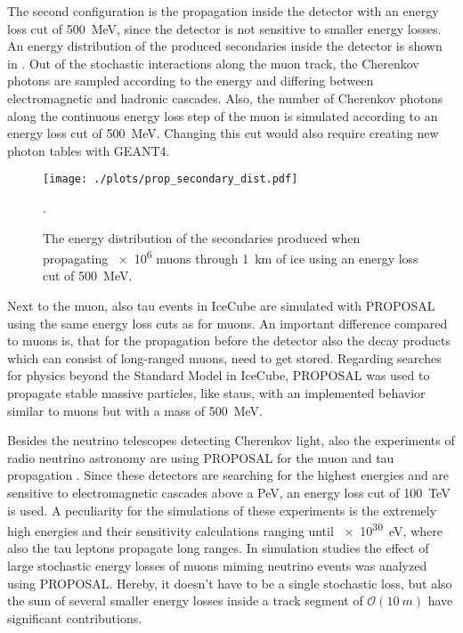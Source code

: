 The second configuration is the propagation inside the detector with an energy loss cut of \SI{500}{MeV}, since the detector is not sensitive to smaller energy losses.
An energy distribution of the produced secondaries inside the detector is shown in .
Out of the stochastic interactions along the muon track, the Cherenkov photons are sampled according to the energy and differing between electromagnetic and hadronic cascades.
Also, the number of Cherenkov photons along the continuous energy loss step of the muon is simulated according to an energy loss cut of \SI{500}{MeV}.
Changing this cut would also require creating new photon tables with GEANT4.
\begin{figure}
    \centering
    \texttt{[image: ./plots/prop\_secondary\_dist.pdf]}
    \caption{The energy distribution of the secondaries produced when propagating \num{e6} muons through \SI{1}{km} of ice using an energy loss cut of \SI{500}{MeV}.}
    \label{fig:prop_sec_dist}.
\end{figure}

Next to the muon, also tau events in IceCube are simulated with PROPOSAL using the same energy loss cuts as for muons.
An important difference compared to muons is, that for the propagation before the detector also the decay products which can consist of long-ranged muons, need to get stored.
Regarding searches for physics beyond the Standard Model in IceCube, PROPOSAL was used to propagate stable massive particles, like staus, with an implemented behavior similar to muons but with a mass of \SI{500}{MeV}.

Besides the neutrino telescopes detecting Cherenkov light, also the experiments of radio neutrino astronomy are using PROPOSAL for the muon and tau propagation \cite{Glaser20nuRadioMC}.
Since these detectors are searching for the highest energies and are sensitive to electromagnetic cascades above a PeV, an energy loss cut of \SI{100}{TeV} is used.
A peculiarity for the simulations of these experiments is the extremely high energies and their sensitivity calculations ranging until \SI{e30}{eV}, where also the tau leptons propagate long ranges.
In simulation studies \cite{GarciaFernandez2020RNOG} the effect of large stochastic energy losses of muons miming neutrino events was analyzed using PROPOSAL.
Hereby, it doesn't have to be a single stochastic loss, but also the sum of several smaller energy losses inside a track segment of $\mathcal{O}(\SI{10}{m})$ have significant contributions.

